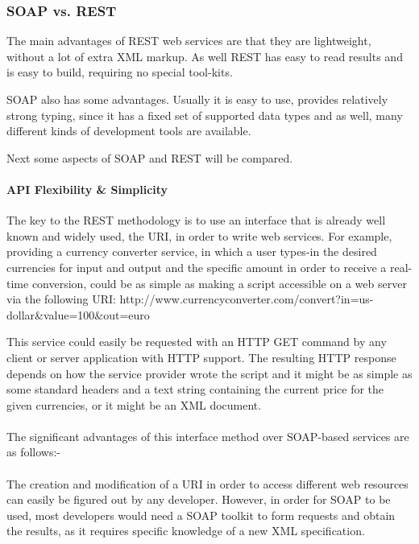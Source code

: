 \subsubsection{SOAP vs. REST\label{sec:back_soap_vs_rest}}

The main advantages of \ac{REST} web services are that they are lightweight, without a lot of extra \ac{XML} markup. As well \ac{REST} has easy to read results and is easy to build, requiring no special tool-kits.

\ac{SOAP} also has some advantages. Usually it is easy to use, provides relatively strong typing, since it has a fixed set of supported data types and as well, many different kinds of development tools are available.

Next some aspects of \ac{SOAP} and \ac{REST} will be compared.

\paragraph{API Flexibility \& Simplicity}

The key to the \ac{REST} methodology is to use an interface that is already well known and widely used, the \ac{URI}, in order to write web services. For example, providing a currency converter service, in which a user types-in the desired currencies for input and output and the specific amount in order to receive a real-time conversion, could be as simple as making a script accessible on a web server via the following \ac{URI}: http://www.currencyconverter.com/convert?in=us-dollar\&value=100\&out=euro

This service could easily be requested with an \ac{HTTP} GET command by any client or server application with \ac{HTTP} support. The resulting \ac{HTTP} response depends on how the service provider wrote the script and it might be as simple as some standard headers and a text string containing the current price for the given currencies, or it might be an \ac{XML} document.
\\
\\
The significant advantages of this interface method over \ac{SOAP}-based services are as follows:-
\\
\\
The creation and modification of a \ac{URI} in order to access different web resources can easily be figured out by any developer. However, in order for \ac{SOAP} to be used, most developers would need a \ac{SOAP} toolkit to form requests and obtain the results, as it requires specific knowledge of a new \ac{XML} specification.
\\
\\
